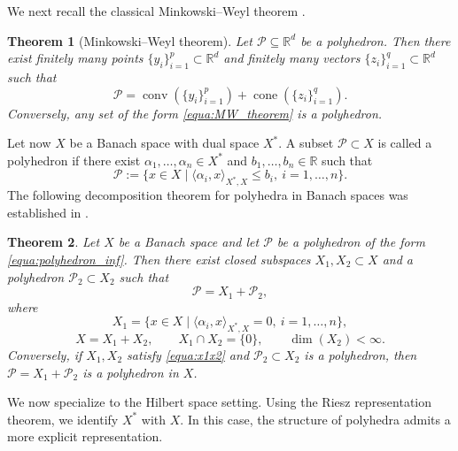 \documentclass{article}
\numberwithin{equation}{section}
\newtheorem{theorem}{Theorem}[section]
\begin{document}
We next recall the classical Minkowski--Weyl theorem \cite{boyd2004convex}.

\begin{theorem}[Minkowski--Weyl theorem]\label{theorem:MW_theorem}
Let $\mathcal{P}\subseteq \mathbb{R}^d$ be a polyhedron. Then there exist finitely many points $\{y_i\}_{i=1}^p\subset \mathbb{R}^d$ and finitely many vectors $\{z_i\}_{i=1}^q\subset \mathbb{R}^d$ such that
\begin{equation}
    \mathcal{P}
    =
    \operatorname{conv}(\{y_i\}_{i=1}^p)
    +
    \operatorname{cone}(\{z_i\}_{i=1}^q).
    \label{equa:MW_theorem}
\end{equation}
Conversely, any set of the form \eqref{equa:MW_theorem} is a polyhedron.
\end{theorem}

Let now $X$ be a Banach space with dual space $X^*$. A subset $\mathcal{P}\subset X$ is called a polyhedron if there exist $\alpha_1,\dots,\alpha_n\in X^*$ and $b_1,\dots,b_n\in \mathbb{R}$ such that
\begin{equation}
    \mathcal{P}
    :=
    \{x\in X \mid \langle \alpha_i,x\rangle_{X^*,X}\le b_i,\ i=1,\dots,n\}.
    \label{equa:polyhedron_inf}
\end{equation}
The following decomposition theorem for polyhedra in Banach spaces was established in \cite{zheng2009pareto,luan2020representation}.

\begin{theorem}
Let $X$ be a Banach space and let $\mathcal{P}$ be a polyhedron of the form \eqref{equa:polyhedron_inf}. Then there exist closed subspaces $X_1,X_2\subset X$ and a polyhedron $\mathcal{P}_2\subset X_2$ such that
\begin{equation}
    \mathcal{P}=X_1+\mathcal{P}_2,
\end{equation}
where
\begin{equation}
    X_1=\{x\in X \mid \langle \alpha_i,x\rangle_{X^*,X}=0,\ i=1,\dots,n\},
\end{equation}
\begin{equation}
    X=X_1+X_2,\qquad X_1\cap X_2=\{0\},\qquad \dim(X_2)<\infty.
    \label{equa:x1x2}
\end{equation}
Conversely, if $X_1,X_2$ satisfy \eqref{equa:x1x2} and $\mathcal{P}_2\subset X_2$ is a polyhedron, then $\mathcal{P}=X_1+\mathcal{P}_2$ is a polyhedron in $X$.
\end{theorem}

We now specialize to the Hilbert space setting. Using the Riesz representation theorem, we identify $X^*$ with $X$. In this case, the structure of polyhedra admits a more explicit representation.
\end{document}
